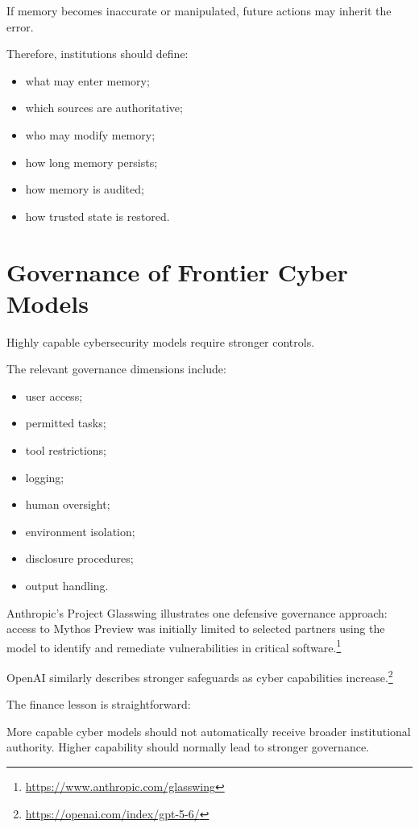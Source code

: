 If memory becomes inaccurate or manipulated, future actions may inherit the error.

Therefore, institutions should define:

\begin{itemize}
    \item what may enter memory;
    \item which sources are authoritative;
    \item who may modify memory;
    \item how long memory persists;
    \item how memory is audited;
    \item how trusted state is restored.
\end{itemize}

\section{Governance of Frontier Cyber Models}

Highly capable cybersecurity models require stronger controls.

The relevant governance dimensions include:

\begin{itemize}
    \item user access;
    \item permitted tasks;
    \item tool restrictions;
    \item logging;
    \item human oversight;
    \item environment isolation;
    \item disclosure procedures;
    \item output handling.
\end{itemize}

Anthropic's Project Glasswing illustrates one defensive governance approach: access to Mythos Preview was initially limited to selected partners using the model to identify and remediate vulnerabilities in critical software.\footnote{\url{https://www.anthropic.com/glasswing}}

OpenAI similarly describes stronger safeguards as cyber capabilities increase.\footnote{\url{https://openai.com/index/gpt-5-6/}}

The finance lesson is straightforward:

\begin{intuition}
More capable cyber models should not automatically receive broader institutional authority. Higher capability should normally lead to stronger governance.
\end{intuition}

